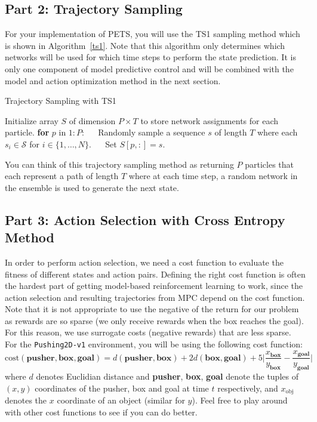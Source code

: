 \documentclass[12pt]{article}
\begin{document}
\subsection*{Part 2: Trajectory Sampling}
For your implementation of PETS, you will use the TS1 sampling method which is shown in Algorithm~\ref{ts1}.  Note that this algorithm only determines which networks will be used for which time steps to perform the state prediction.  It is only one component of model predictive control and will be combined with the model and action optimization method in the next section.  
\begin{algorithm}
\label{alga2c}
\caption{Trajectory Sampling with TS1\label{ts1}}
\begin{algorithmic}[1]
\State Initialize array $S$ of dimension $P\times T$ to store network assignments for each particle.
\State \textbf{for} $p$ in $1:P$:
\State $\quad$ Randomly sample a sequence $s$ of length $T$ where each $s_i \in \mathcal{S}$ for $i \in \{1, \ldots, N\}$.
\State $\quad$ Set $S[p,:] = s$.
\EndProcedure
\end{algorithmic}
\end{algorithm}
You can think of this trajectory sampling method as returning $P$ particles that each represent a path of length $T$ where at each time step, a random network in the ensemble is used to generate the next state. 

\subsection*{Part 3: Action Selection with Cross Entropy Method}
In order to perform action selection, we need a cost function to evaluate the fitness of different states and action pairs.  Defining the right cost function is often the hardest part of getting model-based reinforcement learning to work, since the action selection and resulting trajectories from MPC depend on the cost function. Note that it is not appropriate to use the negative of the return for our problem as rewards are so sparse (we only receive rewards when the box reaches the goal). For this reason, we use surrogate costs (negative rewards) that are less sparse. For the \texttt{Pushing2D-v1} environment, you will be using the following cost function:
\begin{equation}
    \text{cost}(\textbf{pusher},\textbf{box},\textbf{goal}) =d(\textbf{pusher}, \textbf{box}) + 2d(\textbf{box}, \textbf{goal}) + 5\Big|\frac{x_\textbf{box}}{y_\textbf{box}} - \frac{x_\textbf{goal}}{y_\textbf{goal}}\Big|
\end{equation}
where $d$ denotes Euclidian distance and \textbf{pusher}, \textbf{box}, \textbf{goal} denote the tuples of $(x,y)$ coordinates of the pusher, box and goal at time $t$ respectively, and $x_\text{obj}$ denotes the $x$ coordinate of an object (similar for $y$). Feel free to play around with other cost functions to see if you can do better.
\end{document}
